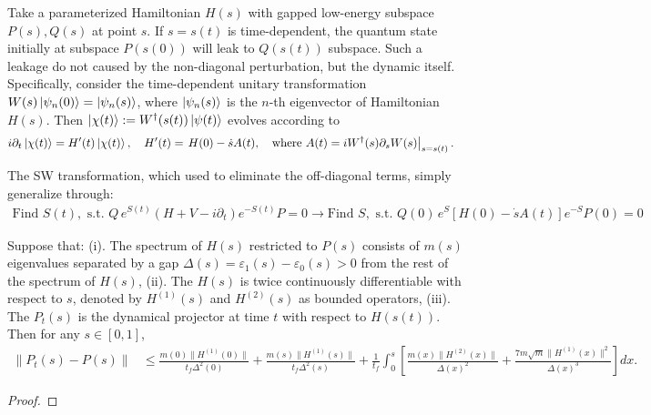 Take a parameterized Hamiltonian $H(s)$ with gapped low-energy subspace $P(s), Q(s)$ at point $s$.
If $s = s(t)$ is time-dependent,
the quantum state initially at subspace $P(s(0))$ will leak to $Q(s(t))$ subspace.
Such a leakage do not caused by the non-diagonal perturbation, but the dynamic itself.
Specifically, consider the time-dependent unitary transformation $W(s)\ket{\psi_n(0)} = \ket{\psi_n(s)}$, where $\ket{\psi_n(s)}$ is the $n$-th eigenvector of Hamiltonian $H(s)$.
Then $\ket{\chi(t)} := W^\dagger(s(t))\ket{\psi(t)}$ evolves according to
\begin{align}
    &i\partial_t \ket{\chi(t)} =  H'(t) \ket{\chi(t)},\quad  H'(t) =\left. H(0) -\dot{s} A(t),\quad \text{where~}  A(t) =  iW^\dagger(s)\partial_s W(s)\right|_{s = s(t)}.\label{eq:rwcord_ham}
\end{align}



The SW transformation, which used to eliminate the off-diagonal terms, simply generalize through:
\begin{align}\label{eq:td_swtrans}
    \boxed{
 \text{Find~} S(t), \text{~s.t.~}Q\,e^{S(t)} (H + V -i\partial_t) e^{-S(t)}P=0 
    }
 \rightarrow  
 \boxed{
 \text{Find~} S, \text{~s.t.~} Q(0)\,e^{S} \left[H(0) -\dot{s} A(t)\right] e^{-S}P(0)= 0
 }
 \end{align}

\begin{theorem}
Suppose that:
(i). The spectrum of $H(s)$ restricted to $P(s)$ consists of $m(s)$ eigenvalues separated by a gap $\Delta(s) = \varepsilon_1(s) - \varepsilon_0(s) > 0$ from the rest of the spectrum of $H(s)$, 
(ii). The $H(s)$ is twice continuously differentiable with respect to $s$, denoted by $H^{(1)}(s)$ and $H^{(2)}(s)$ as bounded operators,
(iii). The $P_t(s)$ is the dynamical projector at time $t$ with respect to $H(s(t))$.
Then for any $s \in [0,1]$,
\begin{align}
\|P_{t}(s) - P(s)\| &\leq\frac{ m(0)\|H^{(1)}(0)\| }{t_f\Delta^2(0)} + \frac{ m(s)\|H^{(1)}(s)\| }{t_f\Delta^2(s)} + \frac{1}{t_f} \int_0^s \left[\frac{m(x)\|H^{(2)}(x)\|}{\Delta(x)^2} +  \frac{7m\sqrt{m}\|H^{(1)}(x)\|^2}{\Delta(x)^{3}} \right]dx.
\end{align}

\end{theorem}
\begin{proof}
    
\end{proof}

